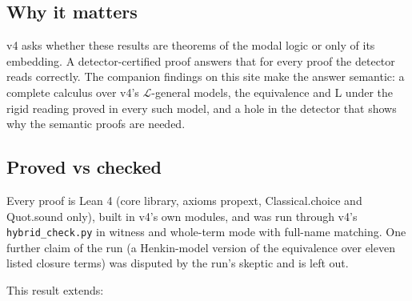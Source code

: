 \documentclass{article}
\begin{document}
\subsection*{Why it matters}

v4 asks whether these results are theorems of the modal logic or only of its embedding. A
detector-certified proof answers that for every proof the detector reads correctly. The
companion findings on this site make the answer semantic: a complete calculus over v4's
$\mathcal L$-general models, the equivalence and L under the rigid reading proved in every such
model, and a hole in the detector that shows why the semantic proofs are needed.

\subsection*{Proved vs checked}

Every proof is Lean 4 (core library, axioms propext, Classical.choice and Quot.sound only),
built in v4's own modules, and was run through v4's \texttt{hybrid\_check.py} in witness and whole-term
mode with full-name matching. One further claim of the run (a Henkin-model version of the
equivalence over eleven listed closure terms) was disputed by the run's skeptic and is left out.

This result extends:
\end{document}
